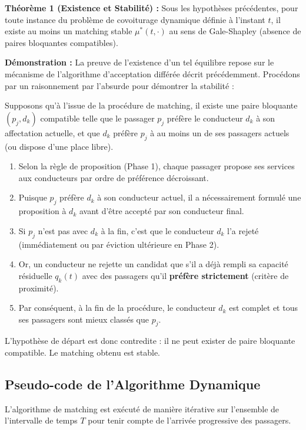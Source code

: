 \documentclass[12pt, a4paper]{article}
\begin{document}
\textbf{Théorème 1 (Existence et Stabilité) :} Sous les hypothèses précédentes, pour toute instance du problème de covoiturage dynamique définie à l'instant $t$, il existe au moins un matching stable $\mu^*(t, \cdot)$ au sens de Gale-Shapley (absence de paires bloquantes compatibles).

\textbf{Démonstration :} La preuve de l'existence d'un tel équilibre repose sur le mécanisme de l'algorithme d'acceptation différée décrit précédemment. Procédons par un raisonnement par l'absurde pour démontrer la stabilité :

Supposons qu'à l'issue de la procédure de matching, il existe une paire bloquante $(p_j, d_k)$ compatible telle que le passager $p_j$ préfère le conducteur $d_k$ à son affectation actuelle, et que $d_k$ préfère $p_j$ à au moins un de ses passagers actuels (ou dispose d'une place libre).
\begin{enumerate}
    \item Selon la règle de proposition (Phase 1), chaque passager propose ses services aux conducteurs par ordre de préférence décroissant.
    \item Puisque $p_j$ préfère $d_k$ à son conducteur actuel, il a nécessairement formulé une proposition à $d_k$ avant d'être accepté par son conducteur final.
    \item Si $p_j$ n'est pas avec $d_k$ à la fin, c'est que le conducteur $d_k$ l'a rejeté (immédiatement ou par éviction ultérieure en Phase 2).
    \item Or, un conducteur ne rejette un candidat que s'il a déjà rempli sa capacité résiduelle $q_k(t)$ avec des passagers qu'il \textbf{préfère strictement} (critère de proximité).
    \item Par conséquent, à la fin de la procédure, le conducteur $d_k$ est complet et tous ses passagers sont mieux classés que $p_j$.
\end{enumerate}
L'hypothèse de départ est donc contredite : il ne peut exister de paire bloquante compatible. Le matching obtenu est stable.

\subsection{Pseudo-code de l'Algorithme Dynamique}
L'algorithme de matching est exécuté de manière itérative sur l'ensemble de l'intervalle de temps $T$ pour tenir compte de l'arrivée progressive des passagers.
\end{document}
